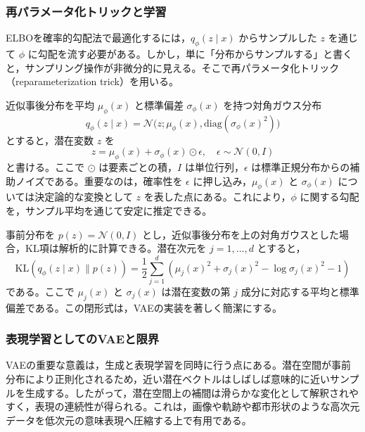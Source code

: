 \subsubsection{再パラメータ化トリックと学習}

ELBOを確率的勾配法で最適化するには，\(q_{\phi}(z \mid x)\) からサンプルした \(z\) を通じて \(\phi\) に勾配を流す必要がある。しかし，単に「分布からサンプルする」と書くと，サンプリング操作が非微分的に見える。そこで再パラメータ化トリック（reparameterization trick）を用いる。

近似事後分布を平均 \(\mu_{\phi}(x)\) と標準偏差 \(\sigma_{\phi}(x)\) を持つ対角ガウス分布
\begin{equation}
q_{\phi}(z \mid x)=\mathcal{N}\bigl(z;\mu_{\phi}(x),\mathrm{diag}(\sigma_{\phi}(x)^2)\bigr)
\end{equation}
とすると，潜在変数 \(z\) を
\begin{equation}
z = \mu_{\phi}(x) + \sigma_{\phi}(x) \odot \epsilon,
\quad
\epsilon \sim \mathcal{N}(0,I)
\end{equation}
と書ける。ここで \(\odot\) は要素ごとの積，\(I\) は単位行列，\(\epsilon\) は標準正規分布からの補助ノイズである。重要なのは，確率性を \(\epsilon\) に押し込み，\(\mu_{\phi}(x)\) と \(\sigma_{\phi}(x)\) については決定論的な変換として \(z\) を表した点にある。これにより，\(\phi\) に関する勾配を，サンプル平均を通じて安定に推定できる。

事前分布を \(p(z)=\mathcal{N}(0,I)\) とし，近似事後分布を上の対角ガウスとした場合，KL項は解析的に計算できる。潜在次元を \(j=1,\dots,d\) とすると，
\begin{equation}
\mathrm{KL}(q_{\phi}(z \mid x)\|p(z))
=
\frac{1}{2}\sum_{j=1}^{d}
\left(
\mu_j(x)^2 + \sigma_j(x)^2 - \log \sigma_j(x)^2 - 1
\right)
\end{equation}
である。ここで \(\mu_j(x)\) と \(\sigma_j(x)\) は潜在変数の第 \(j\) 成分に対応する平均と標準偏差である。この閉形式は，VAEの実装を著しく簡潔にする。

\subsubsection{表現学習としてのVAEと限界}

VAEの重要な意義は，生成と表現学習を同時に行う点にある。潜在空間が事前分布により正則化されるため，近い潜在ベクトルはしばしば意味的に近いサンプルを生成する。したがって，潜在空間上の補間は滑らかな変化として解釈されやすく，表現の連続性が得られる。これは，画像や軌跡や都市形状のような高次元データを低次元の意味表現へ圧縮する上で有用である。

